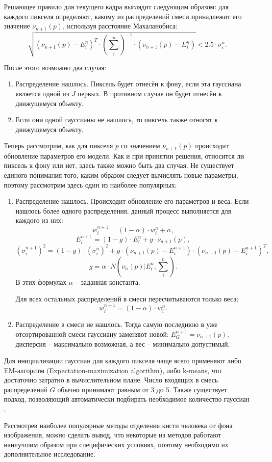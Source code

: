 Решающее правило для текущего кадра выглядит следующим образом: для каждого
пикселя определяют, какому из распределений смеси принадлежит его значение
$\nu_{n+1}(p)$, используя расстояние Махаланобиса:
\begin{equation}
	\sqrt{
	(\nu_{n+1}(p)-E^n_i)^T \cdot (\sum_i^n)^{-1} \cdot 
	(\nu_{n+1}(p) - E^n_i)} < 2.5 \cdot \sigma^n_i.
	\label{mahalabobis}
\end{equation}

После этого возможно два случая:
\begin{enumerate}
	\item Распределение нашлось. Пиксель будет отнесён к фону, если эта
гауссиана является одной из $J$ первых. В противном случае он будет отнесён
к движущемуся объекту.
	\item Если они одной гауссианы не нашлось, то пиксель также относят
к движущемуся объекту.
\end{enumerate}

Теперь рассмотрим, как для пикселя $p$ со значением $\nu_{n+1}(p)$
происходит обновление параметров его модели. Как и при принятии решения,
относится ли пиксель к фону или нет, здесь также можно быть два случая.
Не существует единого понимания того, каким образом следует вычислять новые
параметры, поэтому рассмотрим здесь один из наиболее популярных:
\begin{enumerate}
	\item Распределение нашлось. Происходит обновление его параметров и веса.
Если нашлось более одного распределения, данный процесс выполняется для каждого
из них:
$$w^{n+1}_i = (1-\alpha) \cdot w^n_i + \alpha, $$
$$ E^{n+1}_i = (1-g)\cdot E^n_i + g \cdot \nu_{n+1}(p), $$
$$ (\sigma_i^{n+1})^2 = (1-g)\cdot (\sigma_i^n)^2 + 
g \cdot (\nu_{n+1}(p) - E_i^{n+1}) \cdot (\nu_{n+1}(p) - E^{n+1}_i)^T, $$
$$ g=\alpha \cdot N(\nu_n(p)|E_i^n, \sum_i^n). $$
В этих формулах $\alpha$ -- заданная
константа.

Для всех остальных распределений в смеси пересчитываются только веса:
$$ w^{n+1}_i=(1-\alpha) \cdot w^n_i.$$
	\item Распределение в смеси не нашлось. Тогда самую последнюю в уже 
отсортированной смеси гауссиану заменяют новой: $E^{n+1}_G=\nu_{n+1}(p)$,
дисперсия -- максимально возможная, а вес -- минимально допустимый.
\end{enumerate}

Для инициализации гауссиан для каждого пикселя чаще всего применяют либо
EM-алгоритм (Expectation-maximization algorithm), либо k-means, что
достаточно затратно в вычислительном плане. Число входящих в смесь распределений
$G$ обычно принимают равным от 3 до 5. Также существует подход, позволяющий
автоматически подбирать необходимое количество гауссиан \cite{MOG-3}. 

\bigskip

Рассмотрев наиболее популярные методы отделения кисти человека от фона изображения, можно сделать
вывод, что некоторые из методов работают наилучшим образом при специфических условиях, поэтому
необходимо их дополнительное исследование. 










